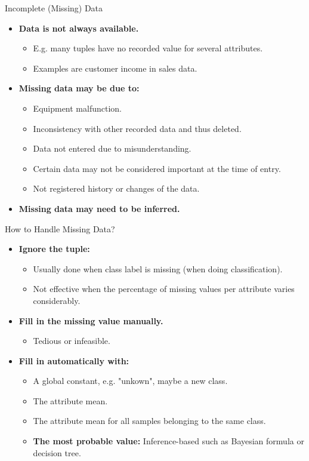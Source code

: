 \begin{frame}{Incomplete (Missing) Data}
	\begin{itemize}
		\item \textbf{Data is not always available.}
		      \begin{itemize}
			      \item E.g. many tuples have no recorded value for several
			            attributes.
			      \item Examples are customer income in sales data.
		      \end{itemize}
		\item \textbf{Missing data may be due to:}
		      \begin{itemize}
			      \item Equipment malfunction.
			      \item Inconsistency with other recorded data and thus deleted.
			      \item Data not entered due to misunderstanding.
			      \item Certain data may not be considered important at the time of
			            entry.
			      \item Not registered history or changes of the data.
		      \end{itemize}
		\item \textbf{Missing data may need to be inferred.}
	\end{itemize}
\end{frame}

\begin{frame}{How to Handle Missing Data?}
	\begin{itemize}
		\item \textbf{Ignore the tuple:}
		      \begin{itemize}
			      \item Usually done when class label is missing (when doing
			            classification).
			      \item Not effective when the percentage of missing values per
			            attribute varies considerably.
		      \end{itemize}
		\item \textbf{Fill in the missing value manually.}
		      \begin{itemize}
			      \item Tedious or infeasible.
		      \end{itemize}
		\item \textbf{Fill in automatically with:}
		      \begin{itemize}
			      \item A global constant, e.g. "unkown", maybe a new class.
			      \item The attribute mean.
			      \item The attribute mean for all samples belonging to the same
			            class.
			      \item \textbf{\color{airforceblue} The most probable value:}
			            Inference-based such as Bayesian formula or decision tree.
		      \end{itemize}
	\end{itemize}
\end{frame}

